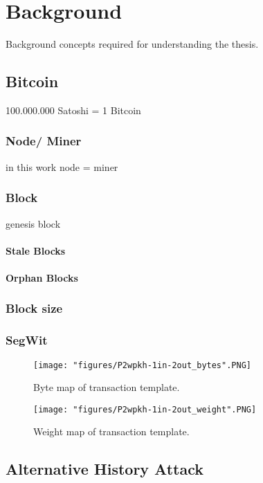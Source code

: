\chapter{Background} 
\label{chapter:background}

Background concepts required for understanding the thesis. 

\section{Bitcoin}
100.000.000 Satoshi = 1 Bitcoin
\subsection{Node/ Miner}
in this work node = miner
\subsection{Block}
genesis block
\subsubsection{Stale Blocks}
\subsubsection{Orphan Blocks}
\subsection{Block size}
\subsection{SegWit}

\cite{seminarPaper}

\begin{figure}
\texttt{[image: "figures/P2wpkh-1in-2out\_bytes".PNG]}
\caption{Byte map of transaction template.\label{fig:bytemap}}
\end{figure}

\begin{figure}
\texttt{[image: "figures/P2wpkh-1in-2out\_weight".PNG]}
\caption{Weight map of transaction template.\label{fig:weightmap}}
\end{figure}

\cite{weightunits}

\section{Alternative History Attack\label{subsection:background:alternativhistoryattack}}

